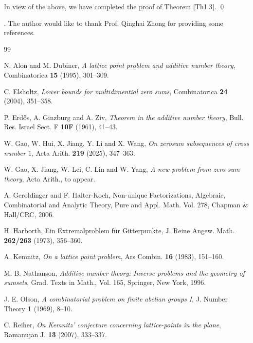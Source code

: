 \documentclass[11pt,reqno]{amsart}
\def\Ack{\medskip\noindent {\bf Acknowledgment}}
\theoremstyle{plain}
\theoremstyle{definition}
\theoremstyle{remark}
\begin{document}
In view of the above, we have completed the proof of Theorem \ref{Th1.3}.
\qed

\Ack. The author would like to thank Prof. Qinghai Zhong for providing some references.

\begin{thebibliography}{99}

 N. Alon and M. Dubiner, {\it A lattice point problem and additive number theory},
Combinatorica {\bf 15} (1995), 301--309.

 C. Elsholtz, {\it Lower bounds for multidimential zero sums}, Combinatorica
{\bf 24} (2004), 351--358.

 P. Erd\H os, A. Ginzburg and A. Ziv, {\it Theorem in the additive number theory},
Bull. Res. Israel Sect. F {\bf 10F} (1961), 41--43.

 W. Gao, W. Hui, X. Jiang, Y. Li and X. Wang,
{\it On zerosum subsequences of cross number $1$}, Acta Arith. {\bf 219} (2025), 347--363.

 W. Gao, X. Jiang, W. Lei, C. Lin and W. Yang, {\it A new problem from zero-sum theory},
Acta Arith., to appear.

 A. Geroldinger and F. Halter-Koch, Non-unique Factorizations, Algebraic, Combinatorial and Analytic Theory, Pure and Appl. Math. Vol. 278, Chapman \& Hall/CRC, 2006.

 H. Harborth, Ein Extremalproblem f\"ur Gitterpunkte, J. Reine Angew. Math.
{\bf 262/263} (1973), 356--360.

 A. Kemnitz, {\it On a lattice point problem}, Ars Combin. {\bf 16} (1983), 151--160.

  M. B. Nathanson, {\it Additive number theory: Inverse problems and the geometry of sumsets}, Grad. Texts in Math., Vol. 165, Springer, New York, 1996.

 J. E. Olson, {\it A combinatorial problem on finite
abelian groups I},  J. Number Theory {\bf 1} (1969), 8--10.

 C. Reiher, {\it On Kemnitz' conjecture concerning lattice-points in the plane},
Ramanujan J. {\bf 13} (2007), 333--337.

\end{thebibliography}
\end{document}
